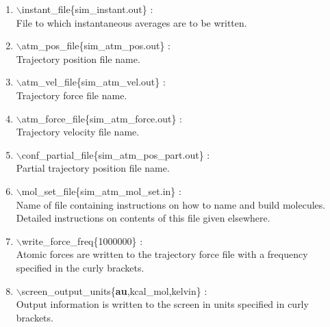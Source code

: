\begin{itemize}
\begin{enumerate}
 \vspace{0.15in} \Large
 \item   $\backslash$instant\_file\{sim\_instant.out\} : \\
   \large
     File to which instantaneous averages are to be written.

 \vspace{0.15in}\Large
 \item   $\backslash$atm\_pos\_file\{sim\_atm\_pos.out\} : \\
   \large
     Trajectory position file name.

 \vspace{0.15in} \Large
 \item   $\backslash$atm\_vel\_file\{sim\_atm\_vel.out\} : \\
  \large Trajectory force file name.  

 \vspace{0.15in} \Large
 \item   $\backslash$atm\_force\_file\{sim\_atm\_force.out\} : \\
   \large
     Trajectory velocity file name.

 \vspace{0.15in}
 \Large
 \item   $\backslash$conf\_partial\_file\{sim\_atm\_pos\_part.out\} : \\
   \large
     Partial trajectory position file name.

 \vspace{0.15in} \Large
 \item   $\backslash$mol\_set\_file\{sim\_atm\_mol\_set.in\} : \\
   \large
    Name of file containing instructions on how to name and build molecules.
    Detailed instructions on contents of this file given elsewhere.

 \vspace{0.15in} \Large
 \item   $\backslash$write\_force\_freq\{1000000\} : \\
   \large
   Atomic forces are written to the trajectory force file with a
   frequency specified in the curly brackets.

 \vspace{0.15in} \Large
 \item   $\backslash$screen\_output\_units\{{\bf au},kcal\_mol,kelvin\} : \\
   \large
   Output information is written to the screen in units specified 
   in curly brackets.


\end{enumerate}
\end{itemize}
